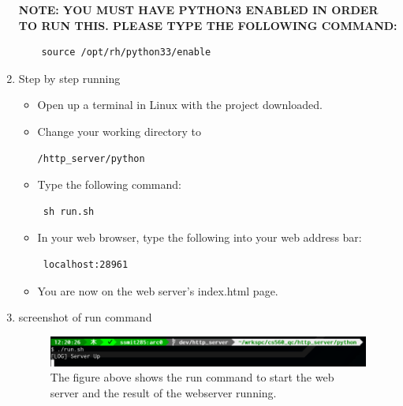 \begin{enumerate}
\textbf{NOTE:  YOU MUST HAVE PYTHON3 ENABLED IN ORDER TO RUN THIS. PLEASE TYPE THE FOLLOWING COMMAND:}
\begin{verbatim}
    source /opt/rh/python33/enable
\end{verbatim}

    \item Step by step running
        \begin{itemize}
            \item Open up a terminal in Linux with the project downloaded.
            \item Change your working directory to \begin{verbatim}/http_server/python \end{verbatim}
            \item Type the following command: \begin{verbatim} sh run.sh \end{verbatim}
            \item In your web browser, type the following into your web address bar: \begin{verbatim} localhost:28961 \end{verbatim}
            \item You are now on the web server's index.html page.
           \end{itemize}
    \item screenshot of run command 
    \begin{figure}[!htbp]
  \includegraphics[width=\textwidth]{screenrun.png}
  \caption{The figure above shows the run command to start the web server and the result of the webserver running.}
\end{figure}
\FloatBarrier
\end{enumerate}